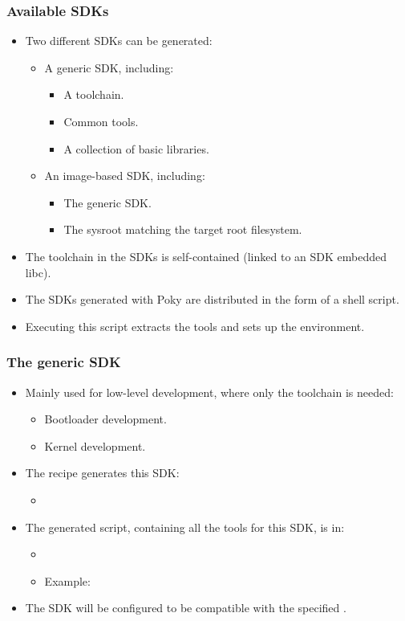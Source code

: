 \begin{frame}
  \frametitle{Available SDKs}
  \begin{itemize}
    \item Two different SDKs can be generated:
      \begin{itemize}
        \item A generic SDK, including:
          \begin{itemize}
            \item A toolchain.
            \item Common tools.
            \item A collection of basic libraries.
          \end{itemize}
        \item An image-based SDK, including:
          \begin{itemize}
            \item The generic SDK.
            \item The sysroot matching the target root filesystem.
          \end{itemize}
      \end{itemize}
    \item The toolchain in the SDKs is self-contained (linked to an SDK
      embedded libc).
    \item The SDKs generated with Poky are distributed in the form of a
      shell script.
    \item Executing this script extracts the tools and sets up the
      environment.
  \end{itemize}
\end{frame}

\begin{frame}
  \frametitle{The generic SDK}
  \begin{itemize}
    \item Mainly used for low-level development, where only the
      toolchain is needed:
      \begin{itemize}
        \item Bootloader development.
        \item Kernel development.
      \end{itemize}
    \item The recipe  generates this SDK:
      \begin{itemize}
        \item {}
      \end{itemize}
    \item The generated script, containing all the tools for this SDK,
      is in:
      \begin{itemize}
        \item {}
        \item Example:
      \end{itemize}
    \item The SDK will be configured to be compatible with the
      specified .
  \end{itemize}
\end{frame}


